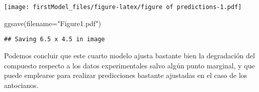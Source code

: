 \documentclass[
]{article}
\newenvironment{Shaded}{\begin{snugshade}}{\end{snugshade}}
\newcommand{\AttributeTok}[1]{\textcolor[rgb]{0.77,0.63,0.00}{#1}}
\newcommand{\FunctionTok}[1]{\textcolor[rgb]{0.00,0.00,0.00}{#1}}
\newcommand{\NormalTok}[1]{#1}
\newcommand{\StringTok}[1]{\textcolor[rgb]{0.31,0.60,0.02}{#1}}
\begin{document}
\texttt{[image: firstModel\_files/figure-latex/figure of predictions-1.pdf]}

\begin{Shaded}
\begin{Highlighting}[]
\FunctionTok{ggsave}\NormalTok{(}\AttributeTok{filename=}\StringTok{"Figure1.pdf"}\NormalTok{)}
\end{Highlighting}
\end{Shaded}

\begin{verbatim}
## Saving 6.5 x 4.5 in image
\end{verbatim}

Podemos concluir que este cuarto modelo ajusta bastante bien la
degradación del compuesto respecto a los datos experimentales salvo
algún punto marginal, y que puede emplearse para realizar predicciones
bastante ajustadas en el caso de los antocianos.
\end{document}
